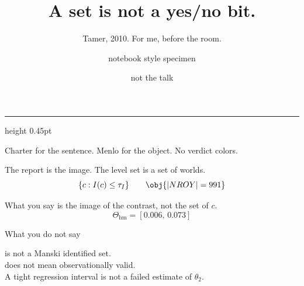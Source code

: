 \documentclass[aspectratio=169,11pt]{beamer}
\title[notebook]{A set is not a yes/no bit.}
\subtitle{Tamer, 2010. For me, before the room.}
\author{notebook style specimen}
\date{not the talk}
\begin{document}
\begin{frame}[plain]
  \vspace{1.6em}
  {\inserttitle\par}
  \vspace{0.7em}
  {\color{rule}\hrule height 0.45pt}
  \vspace{0.8em}
  {\insertsubtitle\par}
  \vfill
  {\ttfamily\small\color{muted}%
    Charter for the sentence.\quad
    Menlo for the object.\quad
    No verdict colors.}
\end{frame}

\begin{frame}{The report is the image.}
  The level set is a set of worlds.
  \[
    \{c : I(c) \le \tau_{I}\}
    \qquad
    \obj{|NROY| = 991}
  \]

  \vspace{0.8em}
  What you say is the image of the contrast, not the set of \(c\).
  \[
    \Theta_{\mathrm{hm}} = [0.006,\, 0.073]
  \]
\end{frame}

\begin{frame}{What you do not say}
  \begin{stoppanel}
     is not a Manski identified set.\\[0.35em]
     does not mean observationally valid.\\[0.35em]
    A tight regression interval is not a failed estimate of \(\theta_2\).
  \end{stoppanel}
  \vspace{1.1em}
\end{frame}
\end{document}
